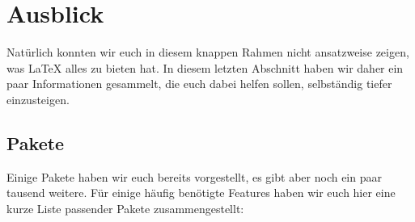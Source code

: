 \section{Ausblick}

Natürlich konnten wir euch in diesem knappen Rahmen nicht ansatzweise zeigen, was \LaTeX{} alles zu bieten hat.
In diesem letzten Abschnitt haben wir daher ein paar Informationen gesammelt, die euch dabei helfen sollen, selbständig tiefer einzusteigen.

\subsection{Pakete}

Einige Pakete haben wir euch bereits vorgestellt, es gibt aber noch ein paar tausend weitere.
Für einige häufig benötigte Features haben wir euch hier eine kurze Liste passender Pakete zusammengestellt:

